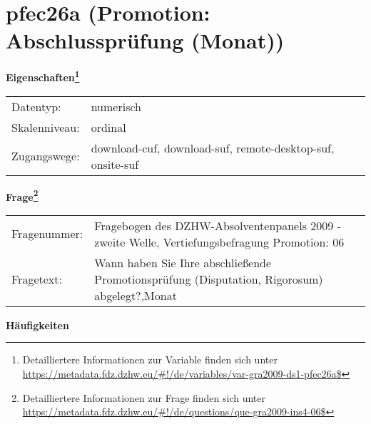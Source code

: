 
    \setcounter{footnote}{0}

    \vspace*{-1.8cm}
	\section{pfec26a (Promotion: Abschlussprüfung (Monat))}
	\label{section:pfec26a}



    \vspace*{0.5cm}
    \noindent\textbf{Eigenschaften\footnote{Detailliertere Informationen zur Variable finden sich unter
		\url{https://metadata.fdz.dzhw.eu/\#!/de/variables/var-gra2009-ds1-pfec26a$}}}\\
	\begin{tabularx}{\hsize}{@{}lX}
	Datentyp: & numerisch \\
	Skalenniveau: & ordinal \\
	Zugangswege: &
	  download-cuf, 
	  download-suf, 
	  remote-desktop-suf, 
	  onsite-suf
 \\
    \end{tabularx}



				\vspace*{0.5cm}
                \noindent\textbf{Frage\footnote{Detailliertere Informationen zur Frage finden sich unter
		              \url{https://metadata.fdz.dzhw.eu/\#!/de/questions/que-gra2009-ins4-06$}}}\\
				\begin{tabularx}{\hsize}{@{}lX}
					Fragenummer: &
					  Fragebogen des DZHW-Absolventenpanels 2009 - zweite Welle, Vertiefungsbefragung Promotion:
					  06
 \\
					Fragetext: & Wann haben Sie Ihre abschließende Promotionsprüfung (Disputation, Rigorosum) abgelegt?,Monat \\
				\end{tabularx}





        		\vspace*{0.5cm}
                \noindent\textbf{Häufigkeiten}

